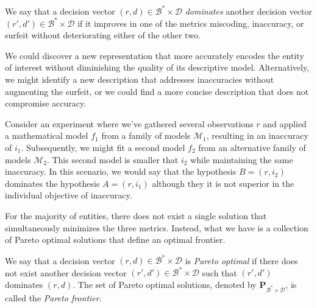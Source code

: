 \begin{definition}
We say that a decision vector $(r, d) \in \mathcal{B}^\ast \times \mathcal{D}$ \emph{dominates} another decision vector $(r', d') \in \mathcal{B}^\ast \times \mathcal{D}$ if it improves in one of the metrics miscoding, inaccuracy, or surfeit without deteriorating either of the other two.
\end{definition}

We could discover a new representation that more accurately encodes the entity of interest without diminishing the quality of its descriptive model. Alternatively, we might identify a new description that addresses inaccuracies without augmenting the surfeit, or we could find a more concise description that does not compromise accuracy.

\begin{example}
\label{ex:nescience_pareto}
Consider an experiment where we've gathered several observations $r$ and applied a mathematical model $f_1$ from a family of models $\mathcal{M}_1$, resulting in an inaccuracy of $i_1$. Subsequently, we might fit a second model $f_2$ from an alternative family of models $\mathcal{M}_2$. This second model is smaller that $i_2$ while maintaining the same inaccuracy. In this scenario, we would say that the hypothesis $B = (r, i_2)$ dominates the hypothesis $A = (r, i_1)$ although they it is not superior in the individual objective of inaccuracy.
\end{example}

For the majority of entities, there does not exist a single solution that simultaneously minimizes the three metrics. Instead, what we have is a collection of Pareto optimal solutions that define an optimal frontier.

\begin{definition}
We say that a decision vector $(r, d) \in \mathcal{B}^\ast \times \mathcal{D}$ is \emph{Pareto optimal} if there does not exist another decision vector $(r', d') \in \mathcal{B}^\ast \times \mathcal{D}$ such that $(r', d')$ dominates $(r, d)$. The set of Pareto optimal solutions, denoted by $\mathbf{P}_{\mathcal{B}^\ast \times \mathcal{D}}$, is called the \emph{Pareto frontier}.
\end{definition}

